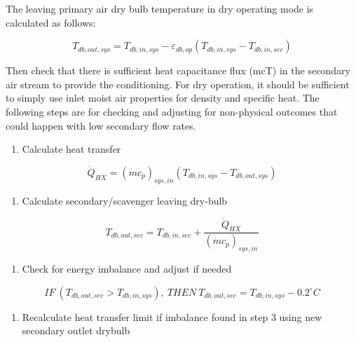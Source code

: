 The leaving primary air dry bulb temperature in dry operating mode is calculated as follows:

\begin{equation}
T_{db,out,sys} = T_{db,in,sys} - \varepsilon_{db,op}\left(T_{db,in,sys}-T_{db,in,sec}\right)
\label{eq:leavingprimaryairdrybulbtemp}
\end{equation}

Then check that there is sufficient heat capacitance flux (mcT) in the secondary air stream to provide the conditioning. For dry operation, it should be sufficient to simply use inlet moist air properties for density and specific heat. The following steps are for checking and adjusting for non-physical outcomes that could happen with low secondary flow rates.

\begin{enumerate}
\def\labelenumi{\arabic{enumi}.}
\tightlist
\item
  Calculate heat transfer
\end{enumerate}

\begin{equation}
\dot{Q}_{HX} = \left(\dot{m}c_{p}\right)_{sys,in} \left(T_{db,in,sys}-T_{db,out,sys}\right)
\label{eq:QdotHX}
\end{equation}

\begin{enumerate}
\def\labelenumi{\arabic{enumi}.}
\setcounter{enumi}{1}
\tightlist
\item
  Calculate secondary/scavenger leaving dry-bulb
\end{enumerate}

\begin{equation}
T_{db,out,sec} = T_{db,in,sec} + \frac{\dot{Q}_{HX}}{ \left(\dot{m}c_{p}\right)_{sys,in}}
\end{equation}

\begin{enumerate}
\def\labelenumi{\arabic{enumi}.}
\setcounter{enumi}{2}
\tightlist
\item
  Check for energy imbalance and adjust if needed
\end{enumerate}

\begin{equation}
IF~\left(T_{db,out,sec}>T_{db,in,sys}\right),~THEN~T_{db,out,sec} = T_{db,in,sys}-0.2^{\circ}C
\end{equation}

\begin{enumerate}
\def\labelenumi{\arabic{enumi}.}
\setcounter{enumi}{3}
\tightlist
\item
  Recalculate heat transfer limit if imbalance found in step 3 using new secondary outlet drybulb
\end{enumerate}

